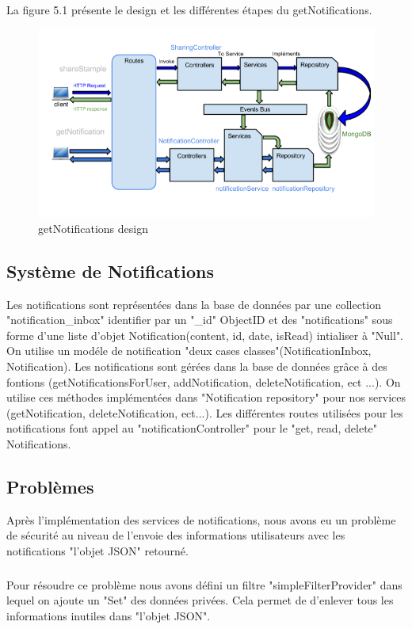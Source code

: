 \paragraph{}
La figure 5.1 présente le design et les différentes étapes du getNotifications.
\begin{figure}[H]
        \centering
                \centering
                \includegraphics[width=\textwidth]{Notifications.png}
               \caption{getNotifications design}
		\label{fig:getNotifications design}
\end{figure}
\subsection{Système de Notifications}
Les notifications sont représentées dans la base de données par une collection "notification\_inbox" identifier par un "\_id" ObjectID et des "notifications" sous forme d'une liste d'objet Notification(content, id, date, isRead) intialiser à "Null".
On utilise un modéle de notification "deux cases classes"(NotificationInbox, Notification).
Les notifications sont gérées dans la base de données grâce à des fontions (getNotificationsForUser, addNotification, deleteNotification, ect ...).
On utilise ces méthodes implémentées dans "Notification repository" pour nos services (getNotification, deleteNotification, ect...).
Les différentes routes utilisées pour les notifications font appel au "notificationController" pour le "get, read, delete" Notifications.
\subsection{Problèmes}
Après l'implémentation des services de notifications, nous avons eu un problème de sécurité au niveau de l'envoie des informations utilisateurs avec les notifications "l'objet JSON" retourné.
\subparagraph{}
Pour résoudre ce problème nous avons défini un filtre "simpleFilterProvider" dans lequel on ajoute un "Set" des données privées. Cela permet de d'enlever tous les informations inutiles dans "l'objet JSON".


